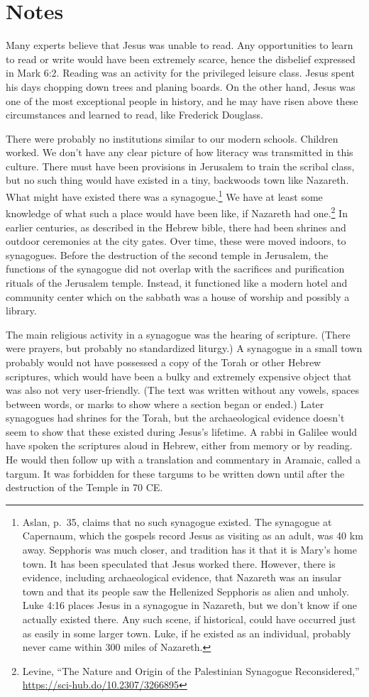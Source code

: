 \documentclass[10pt,twoside]{article} %
\newcommand{\quotesize}{\normalsize{}}
\newcommand{\maintextquotesize}{\renewcommand{\quotesize}{\large{}}}
\newcommand{\notequotesize}{\renewcommand{\quotesize}{\normalsize{}}}
\newenvironment{notesection}[1]{
  \setcounter{secnumdepth}{0}          %
  \section*{#1}
  \setcounter{secnumdepth}{2}          %
  \notequotesize
}%
{
  \maintextquotesize
}
\begin{document}
\begin{notesection}{Notes}
Many experts believe that Jesus was unable to read.  Any opportunities
to learn to read or write would have been extremely scarce, hence the
disbelief expressed in Mark 6:2. Reading was an activity for the
privileged leisure class. Jesus spent his days chopping down trees and
planing boards. On the other hand, Jesus was one of the most
exceptional people in history, and he may have risen above these
circumstances and learned to read, like Frederick Douglass.

There were probably no institutions similar to our modern schools. Children worked. We don't have any clear picture of how
literacy was transmitted in this culture. There must have been provisions
in Jerusalem to train the scribal class, but no such thing would have existed in a tiny,
backwoods town like Nazareth. What might have existed there was a synagogue.\footnote{Aslan, p.~35, claims that no such synagogue existed. The
synagogue at Capernaum, which the gospels record Jesus as visiting as an adult, was 40 km away. Sepphoris was much closer,
and tradition has it that it is Mary's home town. It has been speculated that Jesus worked there. However, there is evidence, including
archaeological evidence, that Nazareth was an insular town and that its people saw the Hellenized Sepphoris as alien and unholy.
Luke 4:16 places Jesus in a synagogue in
Nazareth, but we don't know if one actually existed there. Any such scene, if historical,
could have occurred just as easily in some larger town. Luke, if he existed as an individual,
probably never came within 300 miles of Nazareth.}
We have at least some knowledge of what such a place would have been like, if Nazareth had 
one.\footnote{Levine, ``The Nature and Origin of the Palestinian Synagogue Reconsidered,'' \url{https://sci-hub.do/10.2307/3266895}}
In earlier centuries, as described in the Hebrew bible, there had been shrines and outdoor ceremonies
at the city gates. Over time, these were moved indoors, to synagogues. Before the destruction of
the second temple in Jerusalem, the functions of the synagogue
did not overlap with the sacrifices and purification rituals of the Jerusalem temple. Instead, it
functioned like a modern hotel and community center which on the sabbath was a house of worship and
possibly a library.

The main religious activity in a synagogue was the hearing of scripture. (There were prayers, but
probably no standardized liturgy.) A synagogue in a small town probably would not have possessed
a copy of the Torah or other Hebrew scriptures, which would have been a bulky and extremely expensive object that was
also not very user-friendly. (The text was written without any vowels, spaces between words, or marks
to show where a section began or ended.) Later synagogues had shrines for the Torah, but the archaeological
evidence doesn't seem to show that these existed during Jesus's lifetime.
A rabbi in Galilee would have spoken the scriptures aloud in Hebrew, either from memory or by reading.
He would then follow up with a translation and commentary in Aramaic, called a targum. It
was forbidden for these targums to be written down until after the destruction of the Temple in 70 CE.


\end{notesection}
\end{document}
